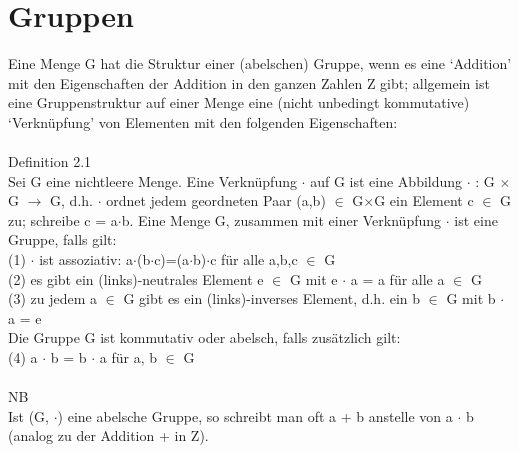
%


\section{Gruppen}
Eine Menge G hat die Struktur einer (abelschen) Gruppe, wenn es eine ‘Addition’ mit den Eigenschaften der Addition in den ganzen Zahlen Z gibt; allgemein ist eine Gruppenstruktur auf einer Menge eine (nicht unbedingt kommutative) ‘Verknüpfung’ von Elementen mit den folgenden Eigenschaften: \\
\\
Definition 2.1\\
Sei G eine nichtleere Menge. Eine Verknüpfung $\cdot$ auf G ist eine Abbildung $\cdot$ : G $\times$ G $\to$ G, d.h. $\cdot$ ordnet jedem geordneten Paar (a,b) $\in$ G$\times$G ein Element c $\in$ G zu; schreibe c = a$\cdot$b. Eine Menge G, zusammen mit einer Verknüpfung $\cdot$ ist eine Gruppe, falls gilt: \\
(1) $\cdot$ ist assoziativ: a$\cdot$(b$\cdot$c)=(a$\cdot$b)$\cdot$c für alle a,b,c $\in$ G\\
(2) es gibt ein (links)-neutrales Element e $\in$ G mit e $\cdot$ a = a für alle a $\in$ G \\
(3) zu jedem a $\in$ G gibt es ein (links)-inverses Element, d.h. ein b $\in$ G mit b $\cdot$ a = e \\
Die Gruppe G ist kommutativ oder abelsch, falls zusätzlich gilt: \\
(4) a $\cdot$ b = b $\cdot$ a für a, b $\in$ G\\ 
\\
NB\\
Ist (G, $\cdot$) eine abelsche Gruppe, so schreibt man oft a + b anstelle von a $\cdot$ b (analog zu der Addition + in Z).

